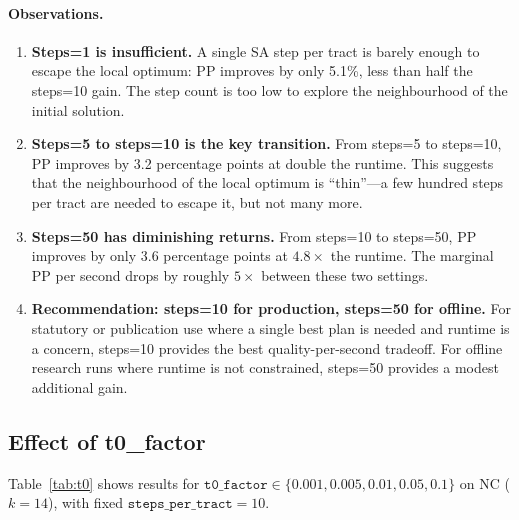 \paragraph{Observations.}
\begin{enumerate}
\item \textbf{Steps=1 is insufficient.}
  A single SA step per tract is barely enough to escape the \metis{}
  local optimum: PP improves by only 5.1\%, less than half the steps=10 gain.
  The step count is too low to explore the neighbourhood of the initial solution.

\item \textbf{Steps=5 to steps=10 is the key transition.}
  From steps=5 to steps=10, PP improves by 3.2 percentage points at double
  the runtime.
  This suggests that the neighbourhood of the \metis{} local optimum is
  ``thin''---a few hundred steps per tract are needed to escape it, but
  not many more.

\item \textbf{Steps=50 has diminishing returns.}
  From steps=10 to steps=50, PP improves by only 3.6 percentage points
  at $4.8\times$ the runtime.
  The marginal PP per second drops by roughly $5\times$ between these two
  settings.

\item \textbf{Recommendation: steps=10 for production, steps=50 for offline.}
  For statutory or publication use where a single best plan is needed and
  runtime is a concern, steps=10 provides the best quality-per-second
  tradeoff.
  For offline research runs where runtime is not constrained, steps=50
  provides a modest additional gain.
\end{enumerate}

\subsection{Effect of t0\_factor}

Table~\ref{tab:t0} shows results for $\mathtt{t0\_factor} \in \{0.001, 0.005, 0.01, 0.05, 0.1\}$
on NC ($k=14$), with fixed $\mathtt{steps\_per\_tract} = 10$.

